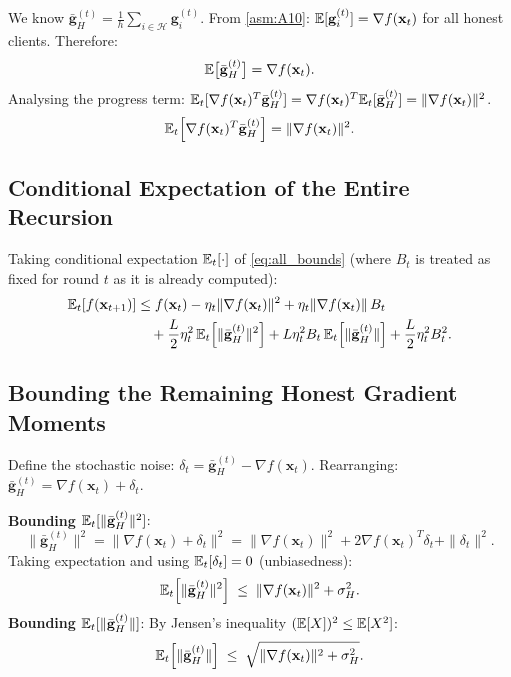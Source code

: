 \documentclass[../main]{subfiles}
\begin{document}
We know $\bar{\mathbf{g}}_H^{(t)} = \frac{1}{h}\sum_{i \in \mathcal{H}} \mathbf{g}_i^{(t)}$.
From \cref{asm:A10}: $\mathbb{E}[\mathbf{g}_i^{(t)}] = \nabla f(\mathbf{x}_t)$ for all honest clients.
Therefore:
\begin{equation}
    \mathbb{E}\bigl[\bar{\mathbf{g}}_H^{(t)}\bigr] = \nabla f(\mathbf{x}_t).
    \label{eq:unbiased_honest}
\end{equation}
Analysing the progress term:
$\mathbb{E}_t[\nabla f(\mathbf{x}_t)^T \bar{\mathbf{g}}_H^{(t)}] = \nabla f(\mathbf{x}_t)^T \mathbb{E}_t[\bar{\mathbf{g}}_H^{(t)}]
= \|\nabla f(\mathbf{x}_t)\|^2$.
\begin{equation}
    \mathbb{E}_t\!\left[\nabla f(\mathbf{x}_t)^T \bar{\mathbf{g}}_H^{(t)}\right] = \|\nabla f(\mathbf{x}_t)\|^2.
    \label{eq:progress_term}
\end{equation}
\subsection{Conditional Expectation of the Entire Recursion}

Taking conditional expectation $\mathbb{E}_t[\cdot]$ of \eqref{eq:all_bounds}
(where $B_t$ is treated as fixed for round $t$ as it is already computed):
\begin{align}
    \mathbb{E}_t[f(\mathbf{x}_{t+1})] &\leq f(\mathbf{x}_t) - \eta_t\|\nabla f(\mathbf{x}_t)\|^2
    + \eta_t\|\nabla f(\mathbf{x}_t)\|\, B_t \nonumber\\
    &\quad + \frac{L}{2}\eta_t^2\, \mathbb{E}_t\!\left[\|\bar{\mathbf{g}}_H^{(t)}\|^2\right]
    + L\eta_t^2 B_t\, \mathbb{E}_t\!\left[\|\bar{\mathbf{g}}_H^{(t)}\|\right]
    + \frac{L}{2}\eta_t^2 B_t^2.
    \label{eq:cond_expect}
\end{align}
\subsection{Bounding the Remaining Honest Gradient Moments}

Define the stochastic noise: $\delta_t = \bar{\mathbf{g}}_H^{(t)} - \nabla f(\mathbf{x}_t)$.
Rearranging: $\bar{\mathbf{g}}_H^{(t)} = \nabla f(\mathbf{x}_t) + \delta_t$.

\textbf{Bounding $\mathbb{E}_t[\|\bar{\mathbf{g}}_H^{(t)}\|^2]$}:
\[
    \|\bar{\mathbf{g}}_H^{(t)}\|^2 = \|\nabla f(\mathbf{x}_t) + \delta_t\|^2
    = \|\nabla f(\mathbf{x}_t)\|^2 + 2\nabla f(\mathbf{x}_t)^T\delta_t + \|\delta_t\|^2.
\]
Taking expectation and using $\mathbb{E}_t[\delta_t] = 0$ (unbiasedness):
\begin{equation}
    \mathbb{E}_t\!\left[\|\bar{\mathbf{g}}_H^{(t)}\|^2\right] \;\leq\; \|\nabla f(\mathbf{x}_t)\|^2 + \sigma_H^2.
    \label{eq:second_moment}
\end{equation}
\textbf{Bounding $\mathbb{E}_t[\|\bar{\mathbf{g}}_H^{(t)}\|]$}:
By Jensen's inequality $(\mathbb{E}[X])^2 \leq \mathbb{E}[X^2]$:
\begin{equation}
    \mathbb{E}_t\!\left[\|\bar{\mathbf{g}}_H^{(t)}\|\right] \;\leq\; \sqrt{\|\nabla f(\mathbf{x}_t)\|^2 + \sigma_H^2}.
    \label{eq:first_moment}
\end{equation}
\end{document}
